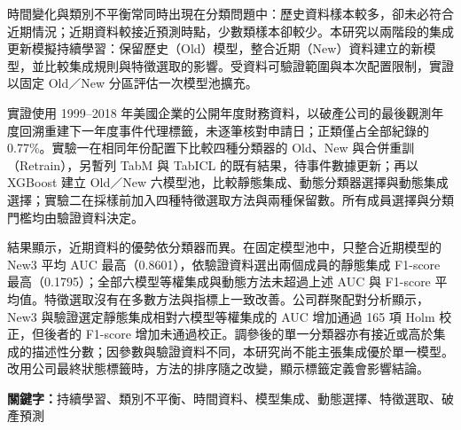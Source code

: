 時間變化與類別不平衡常同時出現在分類問題中：歷史資料樣本較多，卻未必符合近期情況；近期資料較接近預測時點，少數類樣本卻較少。本研究以兩階段的集成更新模擬持續學習：保留歷史（Old）模型，整合近期（New）資料建立的新模型，並比較集成規則與特徵選取的影響。受資料可驗證範圍與本次配置限制，實證以固定 Old／New 分區評估一次模型池擴充。

實證使用 1999--2018 年美國企業的公開年度財務資料，以破產公司的最後觀測年度回溯重建下一年度事件代理標籤，未逐筆核對申請日；正類僅占全部紀錄的 0.77\%。實驗一在相同年份配置下比較四種分類器的 Old、New 與合併重訓（Retrain），另暫列 TabM 與 TabICL 的既有結果，待事件數據更新；再以 XGBoost 建立 Old／New 六模型池，比較靜態集成、動態分類器選擇與動態集成選擇；實驗二在採樣前加入四種特徵選取方法與兩種保留數。所有成員選擇與分類門檻均由驗證資料決定。

結果顯示，近期資料的優勢依分類器而異。在固定模型池中，只整合近期模型的 New3 平均 AUC 最高（0.8601），依驗證資料選出兩個成員的靜態集成 F1-score 最高（0.1795）；全部六模型等權集成與動態方法未超過上述 AUC 與 F1-score 平均值。特徵選取沒有在多數方法與指標上一致改善。公司群聚配對分析顯示，New3 與驗證選定靜態集成相對六模型等權集成的 AUC 增加通過 165 項 Holm 校正，但後者的 F1-score 增加未通過校正。調參後的單一分類器亦有接近或高於集成的描述性分數；因參數與驗證資料不同，本研究尚不能主張集成優於單一模型。改用公司最終狀態標籤時，方法的排序隨之改變，顯示標籤定義會影響結論。

\noindent\textbf{關鍵字：}持續學習、類別不平衡、時間資料、模型集成、動態選擇、特徵選取、破產預測
